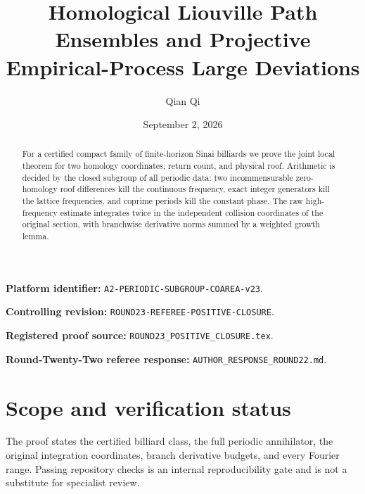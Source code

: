 \documentclass[11pt,reqno]{amsart}
\title[Homological Liouville path ensembles]{Homological Liouville Path Ensembles and Projective Empirical-Process Large Deviations}
\author{Qian Qi}
\date{September 2, 2026}
\theoremstyle{definition}
\theoremstyle{remark}
\begin{document}
\raggedbottom
\begin{abstract}
For a certified compact family of finite-horizon Sinai billiards we prove the
joint local theorem for two homology coordinates, return count, and physical
roof.  Arithmetic is decided by the closed subgroup of all periodic data: two
incommensurable zero-homology roof differences kill the continuous frequency,
exact integer generators kill the lattice frequencies, and coprime periods
kill the constant phase.  The raw high-frequency estimate integrates twice in
the independent collision coordinates of the original section, with
branchwise derivative norms summed by a weighted growth lemma.
\end{abstract}
\maketitle
\noindent\textbf{Platform identifier:} \texttt{A2-PERIODIC-SUBGROUP-COAREA-v23}.\par
\noindent\textbf{Controlling revision:} \texttt{ROUND23-REFEREE-POSITIVE-CLOSURE}.\par
\noindent\textbf{Registered proof source:} \texttt{ROUND23\_POSITIVE\_CLOSURE.tex}.\par
\noindent\textbf{Round-Twenty-Two referee response:} \texttt{AUTHOR\_RESPONSE\_ROUND22.md}.\par
\tableofcontents

\section*{Scope and verification status}
The proof states the certified billiard class, the full periodic annihilator,
the original integration coordinates, branch derivative budgets, and every
Fourier range.  Passing repository checks is an internal reproducibility gate
and is not a substitute for specialist review.
\printbibliography
\end{document}
